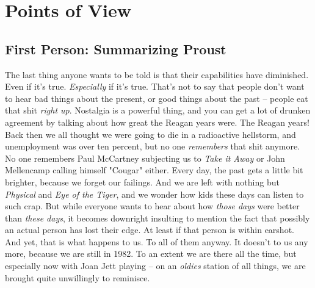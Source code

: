 \chapter{Points of View}

\section[First Person]{First Person: Summarizing Proust}

\hspace{\parindent} The last thing anyone wants to be told is that their capabilities have diminished. Even if it's true. \textit{Especially} if it's true. That's not to say that people don't want to hear bad things about the present, or good things about the past -- people eat that shit \textit{right up}. Nostalgia is a powerful thing, and you can get a lot of drunken agreement by talking about how great the Reagan years were. The Reagan years! Back then we all thought we were going to die in a radioactive hellstorm, and unemployment was over ten percent, but no one \textit{remembers} that shit anymore. No one remembers Paul McCartney subjecting us to \textit{Take it Away} or John Mellencamp calling himself "Cougar" either. Every day, the past gets a little bit brighter, because we forget our failings. And we are left with nothing but \textit{Physical} and \textit{Eye of the Tiger}, and we wonder how kids these days can listen to such crap. But while everyone wants to hear about how \textit{those days} were better than \textit{these days}, it becomes downright insulting to mention the fact that possibly an actual person has lost their edge. At least if that person is within earshot. And yet, that is what happens to us. To all of them anyway. It doesn't to us any more, because we are still in 1982. To an extent we are there all the time, but especially now with Joan Jett playing -- on an \textit{oldies} station of all things, we are brought quite unwillingly to reminisce.

